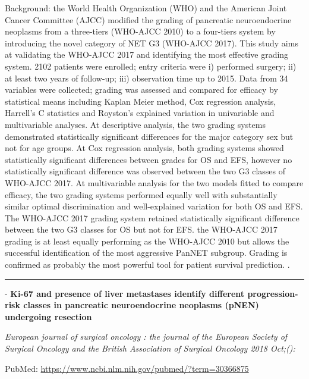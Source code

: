 \documentclass[]{article}
\begin{document}
Background: the World Health Organization (WHO) and the American Joint
Cancer Committee (AJCC) modified the grading of pancreatic
neuroendocrine neoplasms from a three-tiers (WHO-AJCC 2010) to a
four-tiers system by introducing the novel category of NET G3 (WHO-AJCC
2017). This study aims at validating the WHO-AJCC 2017 and identifying
the most effective grading system. 2102 patients were enrolled; entry
criteria were i) performed surgery; ii) at least two years of follow-up;
iii) observation time up to 2015. Data from 34 variables were collected;
grading was assessed and compared for efficacy by statistical means
including Kaplan Meier method, Cox regression analysis, Harrell's C
statistics and Royston's explained variation in univariable and
multivariable analyses. At descriptive analysis, the two grading systems
demonstrated statistically significant differences for the major
category sex but not for age groups. At Cox regression analysis, both
grading systems showed statistically significant differences between
grades for OS and EFS, however no statistically significant difference
was observed between the two G3 classes of WHO-AJCC 2017. At
multivariable analysis for the two models fitted to compare efficacy,
the two grading systems performed equally well with substantially
similar optimal discrimination and well-explained variation for both OS
and EFS. The WHO-AJCC 2017 grading system retained statistically
significant difference between the two G3 classes for OS but not for
EFS. the WHO-AJCC 2017 grading is at least equally performing as the
WHO-AJCC 2010 but allows the successful identification of the most
aggressive PanNET subgroup. Grading is confirmed as probably the most
powerful tool for patient survival prediction. .

{}

{}

\begin{center}\rule{0.5\linewidth}{\linethickness}\end{center}

 - \textbf{Ki-67 and presence of liver metastases identify different
progression-risk classes in pancreatic neuroendocrine neoplasms (pNEN)
undergoing resection}

\emph{European journal of surgical oncology : the journal of the
European Society of Surgical Oncology and the British Association of
Surgical Oncology 2018 Oct;():}

PubMed: \url{https://www.ncbi.nlm.nih.gov/pubmed/?term=30366875}
\end{document}

